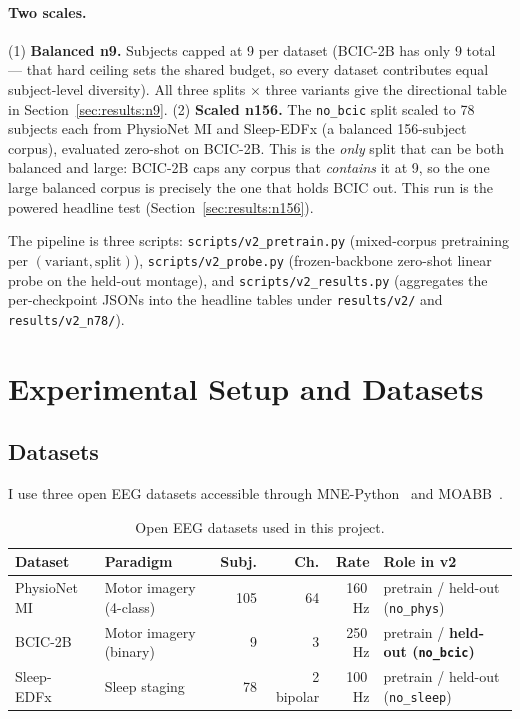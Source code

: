 \documentclass[11pt]{article}
\begin{document}
\paragraph{Two scales.}
(1) \textbf{Balanced n9.} Subjects capped at 9 per dataset (BCIC-2B has only 9
total --- that hard ceiling sets the shared budget, so every dataset
contributes equal subject-level diversity). All three splits $\times$ three
variants give the directional table in Section~\ref{sec:results:n9}.
(2) \textbf{Scaled n156.} The \texttt{no\_bcic} split scaled to 78 subjects
each from PhysioNet MI and Sleep-EDFx (a balanced 156-subject corpus),
evaluated zero-shot on BCIC-2B. This is the \emph{only} split that can be both
balanced and large: BCIC-2B caps any corpus that \emph{contains} it at 9, so
the one large balanced corpus is precisely the one that holds BCIC out. This
run is the powered headline test (Section~\ref{sec:results:n156}).

The pipeline is three scripts: \texttt{scripts/v2\_pretrain.py} (mixed-corpus
pretraining per $(\text{variant}, \text{split})$),
\texttt{scripts/v2\_probe.py} (frozen-backbone zero-shot linear probe on the
held-out montage), and \texttt{scripts/v2\_results.py} (aggregates the
per-checkpoint JSONs into the headline tables under \texttt{results/v2/} and
\texttt{results/v2\_n78/}).

\section{Experimental Setup and Datasets}
\label{sec:setup}

\subsection{Datasets}
\label{sec:setup:datasets}

I use three open EEG datasets accessible through
MNE-Python~\cite{gramfort2013mne} and MOABB~\cite{aristimunha2023moabb}.

\begin{table}[h]
\centering
\caption{Open EEG datasets used in this project.}
\label{tab:datasets}
\small
\begin{tabular}{llrrrl}
\toprule
\textbf{Dataset} & \textbf{Paradigm} & \textbf{Subj.} & \textbf{Ch.} & \textbf{Rate} & \textbf{Role in v2} \\
\midrule
PhysioNet MI~\cite{schalk2004physionet}
  & Motor imagery (4-class)  & 105 & 64  & 160\,Hz  & pretrain / held-out (\texttt{no\_phys}) \\
BCIC-2B~\cite{tangermann2012bcic}
  & Motor imagery (binary)   &   9 &  3  & 250\,Hz  & pretrain / \textbf{held-out (\texttt{no\_bcic})} \\
Sleep-EDFx~\cite{kemp2000sleepedf}
  & Sleep staging            &  78 & 2 bipolar & 100\,Hz & pretrain / held-out (\texttt{no\_sleep}) \\
\bottomrule
\end{tabular}
\end{table}
\end{document}
